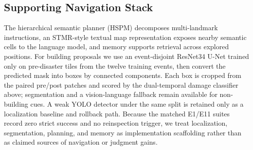 \subsection{Supporting Navigation Stack}
The hierarchical semantic planner (HSPM) decomposes multi-landmark instructions, an STMR-style textual map representation exposes nearby semantic cells to the language model, and memory supports retrieval across explored positions.
For building proposals we use an event-disjoint ResNet34 U-Net trained only on pre-disaster tiles from the twelve training events, then convert the predicted mask into boxes by connected components.
Each box is cropped from the paired pre/post patches and scored by the dual-temporal damage classifier above; segmentation and a vision-language fallback remain available for non-building cues.
A weak YOLO detector under the same split is retained only as a localization baseline and rollback path.
Because the matched E1/E11 suites record zero strict success and no reinspection trigger, we treat localization, segmentation, planning, and memory as implementation scaffolding rather than as claimed sources of navigation or judgment gains.
